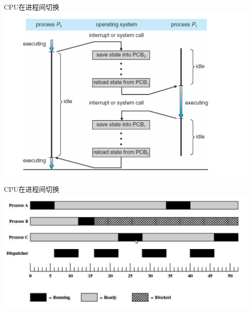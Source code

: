 \documentclass[xcolor=svgnames]{beamer}
\begin{document}
\begin{CJK*}{UTF8}{gbsn}
\begin{frame}{CPU在进程间切换}
\includegraphics[width=1.0\textwidth]{switch.png}
\end{frame}

\begin{frame}{CPU在进程间切换}
\includegraphics[width=1.0\textwidth]{dispatcher.png}
\end{frame}


\end{CJK*}
\end{document}

